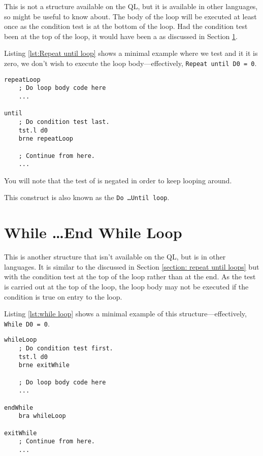 This is not a structure available on the QL, but it is available in other languages, so might be useful to know about. The body of the loop will be executed at least once as the condition test is at the bottom of the loop. Had the condition test been at the top of the loop, it would have been a  as discussed in Section \ref{section: while loops}.

Listing \ref{lst:Repeat until loop} shows a minimal example where we test  and it it is zero, we don't wish to execute the loop body---effectively, \texttt{Repeat until D0 = 0}.

\begin{lstlisting}[caption={Repeat until loop},label={lst:Repeat until loop}]
repeatLoop
    ; Do loop body code here
    ...
    
until
    ; Do condition test last.
    tst.l d0
    brne repeatLoop
    
    ; Continue from here.
    ...
\end{lstlisting}

You will note that the test of  is negated in order to keep looping around. 

This construct is also known as the \texttt{Do \ldots Until loop}.

\section{While \ldots\protect End While Loop}\label{section: while loops}

This is another structure that isn't available on the QL, but is in other languages. It is similar to the  discussed in Section \ref{section: repeat until loops} but with the condition test at the top of the loop rather than at the end. As the test is carried out at the top of the loop, the loop body may not be executed if the condition is true on entry to the loop.

Listing \ref{lst:while loop} shows a minimal example of this structure---effectively, \texttt{While D0 = 0}.

\begin{lstlisting}[caption={While loop},label={lst:while loop}]
whileLoop
    ; Do condition test first.
    tst.l d0
    brne exitWhile

    ; Do loop body code here
    ...
    
endWhile
    bra whileLoop

exitWhile
    ; Continue from here.
    ...
\end{lstlisting}

